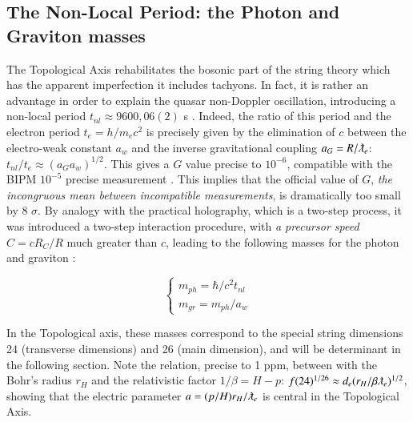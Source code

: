 \documentclass[a4paper,9pt]{article}
\begin{document}
    
     
\subsection{The Non-Local Period: the Photon and Graviton masses}
The Topological Axis rehabilitates the bosonic part of the string theory which has the apparent imperfection it includes tachyons. In fact, it is rather an advantage in order to explain the quasar non-Doppler oscillation, introducing a non-local period $t_{nl} \approx 9600,06 (2) $ s \cite{Kotov}. Indeed, the ratio of this period and the electron period $t_e = h/m_ec^2$ is precisely given by the elimination of $c$ between the electro-weak constant $a_w$ and the inverse gravitational coupling $a_G = R/\lambdabar_e $: $t_{nl} /t_e   \approx  (a_G a_w)^{1/2}$. This gives a $G$ value precise to $10^{-6}$, compatible with the BIPM $10^{-5}$ precise measurement \cite {Quinn}. This implies that the official value of $G$, \textit{the incongruous mean between incompatible measurements}, is dramatically too small by 8 $\sigma$. By analogy with the practical holography, which is a two-step process, it was introduced a two-step interaction procedure, with \textit{a precursor speed} $C = cR_C/R$ much greater than $c$, leading to the following masses for the photon and graviton \cite{Sanchez2}:

\begin{equation}\label{Eq9}
 \left\{
    \begin{array}{ll}
        m_{ph} = \hbar/c^2t_{nl}\\
        m_{gr} =m_{ph}/a_w
    \end{array}
\right.
\end{equation}

In the Topological axis, these masses correspond to the special string dimensions 24 (transverse dimensions) and 26 (main dimension), and will be determinant in the following section. Note the relation, precise to 1 ppm, between with the Bohr's radius $r_H$  and the relativistic factor $1/\beta = H-p$: $f(24)^{1/26} \approx d_e (r_H/\beta\lambdabar_e)^{1/2}$, showing that the electric parameter $a = (p/H)r_H/\lambdabar_e$ is central in the Topological Axis.

%

\end{document}
